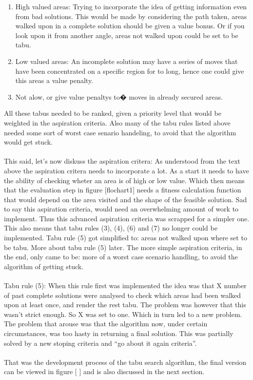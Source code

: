 \begin{enumerate}
\begin{enumerate}
\item{} High valued areas:
\subitem{} Trying to incorporate the idea of getting information even from bad solutions. This would be made by considering the path taken, areas walked upon in a complete solution should be given a value bonus. Or if you look upon it from another angle, areas not walked upon could be set to be tabu. 
\item{} Low valued areas:
\subitem {}An incomplete solution may have a series of moves that have been concentrated on a specific region for to long, hence one could give this areas a value penalty.
\item{} Not alow, or give value penaltys to� moves in already secured areas.
\end{enumerate}

All these tabus needed to be ranked, given a priority level that would be weighted in the aspiration criteria. Also many of the tabu rules listed above needed some sort of worst case senario handeling, to avoid that the algorithm would get stuck.\\
\\This said, let's now diskuss the aspiration critera:
As understood from the text above the aspiration critera needs to incorporate a lot. As a start it needs to have the ability of checking wheter an area is of high or low value. Which then means that the evaluation step in figure [flochart1] needs a fitness calculation function that would depend on the area visited and the shape of the feasible solution. Sad to say this aspiration criteria, would need an overwhelming amount of work to implement. Thus this advanced aspiration criteria was scrapped for a simpler one. This also means that tabu rules (3), (4), (6) and (7) no longer could be implemented. Tabu rule (5) got simplified to:  areas not walked upon where set to be tabu. More about tabu rule (5) later. The more simple aspiration criteria, in the end, only came to be: more of a worst case scenario handling, to avoid the algorithm of getting stuck.\\
\\Tabu rule (5): When this rule first was implemented the idea was that X number of past complete solutions were analysed to check which areas had been walked upon at least once, and render the rest tabu. The problem was however that this wasn't strict enough. So X was set to one. Which in turn led to a new problem. The problem that arouse was that the algorithm now, under certain circumstances, was too hasty in returning a final solution. This was partially solved by a new stoping criteria and ``go about it again criteria''.\\
\\
That was the development process of the tabu search algorithm, the final version can be viewed in figure [ ] and is also discussed in the next section.\\

\end{enumerate}
